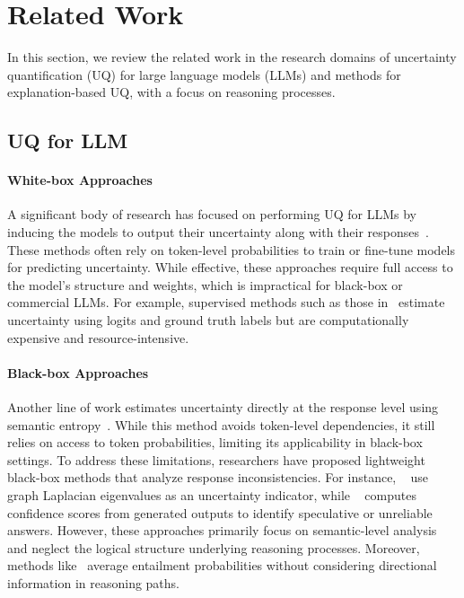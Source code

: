 
\section{Related Work}

In this section, we review the related work in the research domains of uncertainty quantification (UQ) for large language models (LLMs) and methods for explanation-based UQ, with a focus on reasoning processes.



\subsection{UQ for LLM}

\paragraph{White-box Approaches} A significant body of research has focused on performing UQ for LLMs by inducing the models to output their uncertainty along with their responses~\cite{kadavath2022language, lin2022teaching, mielke2020linguistic, tian2023just}. These methods often rely on token-level probabilities to train or fine-tune models for predicting uncertainty. While effective, these approaches require full access to the model's structure and weights, which is impractical for black-box or commercial LLMs. For example, supervised methods such as those in~\cite{kadavath2022language} estimate uncertainty using logits and ground truth labels but are computationally expensive and resource-intensive.
\paragraph{Black-box Approaches} Another line of work estimates uncertainty directly at the response level using semantic entropy~\cite{kuhn2023semantic}. While this method avoids token-level dependencies, it still relies on access to token probabilities, limiting its applicability in black-box settings. To address these limitations, researchers have proposed lightweight black-box methods that analyze response inconsistencies. For instance, ~\citet{lin2023generating} use graph Laplacian eigenvalues as an uncertainty indicator, while ~\citet{chen2023quantifying} computes confidence scores from generated outputs to identify speculative or unreliable answers. However, these approaches primarily focus on semantic-level analysis and neglect the logical structure underlying reasoning processes. Moreover, methods like~\cite{lin2023generating} average entailment probabilities without considering directional information in reasoning paths.

